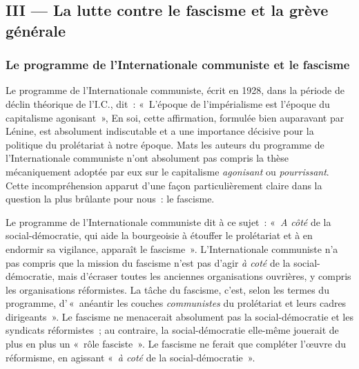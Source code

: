 \documentclass[french,twoside]{book} %
\begin{document}
\subsection[{III — La lutte contre le fascisme et la grève générale}]{III — La lutte contre le fascisme et la grève générale}
\subsubsection[{Le programme de l’Internationale communiste et le fascisme}]{Le programme de l’Internationale communiste et le fascisme}
\noindent Le programme de l’Internationale communiste, écrit en 1928, dans la période de déclin théorique de l’I.C., dit : « L’époque de l’impérialisme est l’époque du capitalisme agonisant », En soi, cette affirmation, formulée bien auparavant par Lénine, est absolument indiscutable et a une importance décisive pour la politique du prolétariat à notre époque. Mats les auteurs du programme de l’Internationale communiste n’ont absolument pas compris la thèse mécaniquement adoptée par eux sur le capitalisme \emph{agonisant} ou \emph{pourrissant}. Cette incompréhension apparut  d’une façon particulièrement claire dans la question la plus brûlante pour nous : le fascisme.\par
Le programme de l’Internationale communiste dit à ce sujet : « \emph{A côté} de la social-démocratie, qui aide la bourgeoisie à étouffer le prolétariat et à en endormir sa vigilance, apparaît le fascisme ». L’Internationale communiste n’a pas compris que la mission du fascisme n’est pas d’agir \emph{à coté} de la social-démocratie, mais d’écraser toutes les anciennes organisations ouvrières, y compris les organisations réformistes. La tâche du fascisme, c’est, selon les termes du programme, d’ « anéantir les couches \emph{communistes} du prolétariat et leurs cadres dirigeants ». Le fascisme ne menacerait absolument pas la social-démocratie et les syndicats réformistes ; au contraire, la social-démocratie elle-même jouerait de plus en plus un « rôle fasciste ». Le fascisme ne ferait que compléter l’œuvre du réformisme, en agissant « \emph{à coté} de la social-démocratie ».\par
\end{document}
